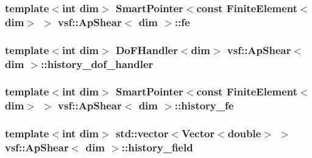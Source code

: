 \hypertarget{classvsf_1_1ApShear_a228388a897a688b79d0800f3bb18697f}{
\subsubsection[{fe}]{\setlength{\rightskip}{0pt plus 5cm}template$<$int dim$>$ Smart\-Pointer$<$const Finite\-Element$<$dim$>$ $>$ {\bf vsf\-::\-Ap\-Shear}$<$ dim $>$\-::fe\hspace{0.3cm}{\ttfamily [private]}}}\label{classvsf_1_1ApShear_a228388a897a688b79d0800f3bb18697f}
\hypertarget{classvsf_1_1ApShear_acdcfb9ec77c56722ce42173f7599c336}{
\subsubsection[{history\-\_\-dof\-\_\-handler}]{\setlength{\rightskip}{0pt plus 5cm}template$<$int dim$>$ Do\-F\-Handler$<$dim$>$ {\bf vsf\-::\-Ap\-Shear}$<$ dim $>$\-::history\-\_\-dof\-\_\-handler\hspace{0.3cm}{\ttfamily [private]}}}\label{classvsf_1_1ApShear_acdcfb9ec77c56722ce42173f7599c336}
\hypertarget{classvsf_1_1ApShear_a3c2f9d0e479ed2ebcb3660a3b7b72aee}{
\subsubsection[{history\-\_\-fe}]{\setlength{\rightskip}{0pt plus 5cm}template$<$int dim$>$ Smart\-Pointer$<$const Finite\-Element$<$dim$>$ $>$ {\bf vsf\-::\-Ap\-Shear}$<$ dim $>$\-::history\-\_\-fe\hspace{0.3cm}{\ttfamily [private]}}}\label{classvsf_1_1ApShear_a3c2f9d0e479ed2ebcb3660a3b7b72aee}
\hypertarget{classvsf_1_1ApShear_ab47e19f00b1a5475699673c44d48ab8d}{
\subsubsection[{history\-\_\-field}]{\setlength{\rightskip}{0pt plus 5cm}template$<$int dim$>$ std\-::vector$<$Vector$<$double$>$ $>$ {\bf vsf\-::\-Ap\-Shear}$<$ dim $>$\-::history\-\_\-field\hspace{0.3cm}{\ttfamily [private]}}}\label{classvsf_1_1ApShear_ab47e19f00b1a5475699673c44d48ab8d}
